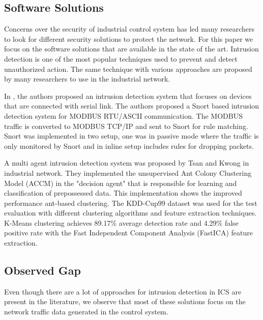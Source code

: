 \documentclass[conference]{IEEEtran}
\begin{document}
\subsection{Software Solutions}\label{AA}
Concerns over the security of industrial control system has led many researchers to look for different security solutions to protect the network. For this paper we focus on the software solutions that are available in the state of the art. Intrusion detection is one of the most popular techniques used to prevent and detect unauthorized action. The same technique with various approaches are proposed by many researchers to use in the industrial network. 
\par In \cite{c2}, the authors proposed an intrusion detection system that focuses on devices that are connected with serial link. The authors proposed a Snort based intrusion detection system for MODBUS RTU/ASCII communication. The MODBUS traffic is converted to MODBUS TCP/IP and sent to Snort for rule matching. Snort was implemented in two setup, one was in passive mode where the traffic is only monitored by Snort and in inline setup includes rules for dropping packets.
\par A multi agent intrusion detection system was proposed by Tsan and Kwong \cite{c3} in industrial network. They implemented the unsupervised Ant Colony Clustering Model (ACCM) in the "decision agent" that is responsible for learning and classification of prepossessed data. This implementation shows the improved performance ant-based clustering. The KDD-Cup99 dataset was used for the test evaluation with different clustering algorithms and feature extraction techniques. K-Means clustering achieves 89.17\% average detection rate and  4.29\% false positive rate with the Fast Independent Component Analysis (FastICA) feature extraction.
\subsection{Observed Gap}
Even though there are a lot of approaches for intrusion detection in ICS are present in the literature, we observe that most of these solutions focus on the network traffic data generated in the control system.  
\end{document}
